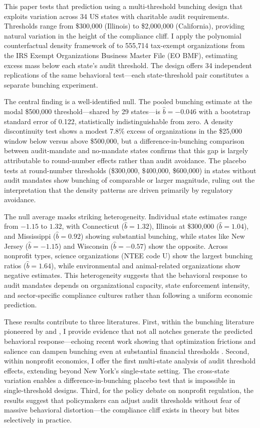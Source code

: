 \documentclass[12pt]{article}
\begin{document}
This paper tests that prediction using a multi-threshold bunching design that exploits variation across 34 US states with charitable audit requirements. Thresholds range from \$300,000 (Illinois) to \$2,000,000 (California), providing natural variation in the height of the compliance cliff. I apply the polynomial counterfactual density framework of \citet{Kleven2013} to 555,714 tax-exempt organizations from the IRS Exempt Organizations Business Master File (EO BMF), estimating excess mass below each state's audit threshold. The design offers 34 independent replications of the same behavioral test---each state-threshold pair constitutes a separate bunching experiment.

The central finding is a well-identified null. The pooled bunching estimate at the modal \$500,000 threshold---shared by 29 states---is $\hat{b} = -0.046$ with a bootstrap standard error of 0.122, statistically indistinguishable from zero. A density discontinuity test shows a modest 7.8\% excess of organizations in the \$25,000 window below versus above \$500,000, but a difference-in-bunching comparison between audit-mandate and no-mandate states confirms that this gap is largely attributable to round-number effects rather than audit avoidance. The placebo tests at round-number thresholds (\$300,000, \$400,000, \$600,000) in states without audit mandates show bunching of comparable or larger magnitude, ruling out the interpretation that the density patterns are driven primarily by regulatory avoidance.

The null average masks striking heterogeneity. Individual state estimates range from $-1.15$ to $1.32$, with Connecticut ($\hat{b} = 1.32$), Illinois at \$300,000 ($\hat{b} = 1.04$), and Mississippi ($\hat{b} = 0.92$) showing substantial bunching, while states like New Jersey ($\hat{b} = -1.15$) and Wisconsin ($\hat{b} = -0.57$) show the opposite. Across nonprofit types, science organizations (NTEE code U) show the largest bunching ratios ($\hat{b} = 1.64$), while environmental and animal-related organizations show negative estimates. This heterogeneity suggests that the behavioral response to audit mandates depends on organizational capacity, state enforcement intensity, and sector-specific compliance cultures rather than following a uniform economic prediction.

These results contribute to three literatures. First, within the bunching literature pioneered by \citet{Saez2010} and \citet{Kleven2013}, I provide evidence that not all notches generate the predicted behavioral response---echoing recent work showing that optimization frictions and salience can dampen bunching even at substantial financial thresholds \citep{Chetty2011, Kleven2016}. Second, within nonprofit economics, I offer the first multi-state analysis of audit threshold effects, extending \citet{Yildirim2018} beyond New York's single-state setting. The cross-state variation enables a difference-in-bunching placebo test that is impossible in single-threshold designs. Third, for the policy debate on nonprofit regulation, the results suggest that policymakers can adjust audit thresholds without fear of massive behavioral distortion---the compliance cliff exists in theory but bites selectively in practice.
\end{document}
